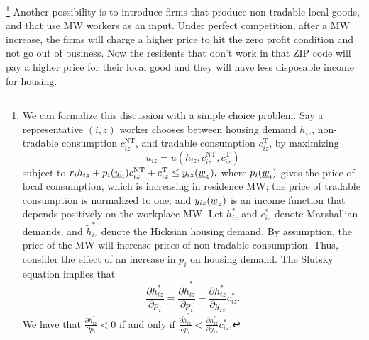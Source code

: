 \footnote{We can formalize this discussion with a simple choice problem.
Say a representative $(i,z)$ worker chooses between housing demand $h_{iz}$,
non-tradable consumption $c^{\text{NT}}_{iz}$, and tradable consumption $c^{\text{T}}_{iz}$,
by maximizing
$$u_{iz} = u \left(h_{iz}, c^{\text{NT}}_{iz}, c^{\text{T}}_{iz}\right)$$
subject to 
$r_i h_{iz} + p_i(\underline{w}_i) c^{\text{NT}}_{iz} + c^{\text{T}}_{iz} \leq y_{iz}(\underline{w}_z),$
where $p_i(\underline{w}_i)$ gives the price of local consumption, which is increasing in residence MW;
the price of tradable consumption is normalized to one; and 
$y_{iz}(\underline{w}_z)$ is an income function that depends positively on the workplace MW.
Let $h_{iz}^*$ and $c_{iz}^*$ denote Marshallian demands, and 
$\tilde h_{iz}^*$ denote the Hicksian housing demand.
By assumption, the price of the MW will increase prices of non-tradable consumption.
Thus, consider the effect of an increase in $p_i$ on housing demand.
The Slutsky equation implies that
$$\frac{\partial h_{iz}^*}{\partial p_i} 
   = \frac{\partial \tilde h_{iz}^*}{\partial p_i} 
   - \frac{\partial h_{iz}^*}{\partial y_{iz}} c_{iz}^*.$$
We have that $\frac{\partial h_{iz}^*}{\partial p_i} < 0$ if and only if 
$\frac{\partial \tilde h_{iz}^*}{\partial p_i} 
< \frac{\partial h_{iz}^*}{\partial y_{iz}} c_{iz}^*$.} %
Another possibility is to introduce firms that produce non-tradable local goods, and that 
use MW workers as an input. Under perfect competition, after a MW increase, the firms will 
charge a higher price to hit the zero profit condition and not go out of business. Now the 
residents that don't work in that ZIP code will pay a higher price for their local good 
and they will have less disposable income for housing.

